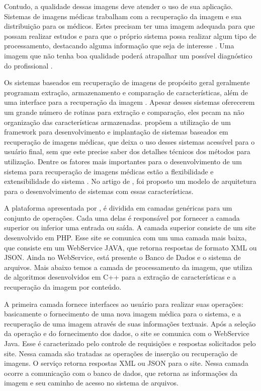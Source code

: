 Contudo, a qualidade dessas imagens deve atender o uso de sua aplicação.
Sistemas de imagens médicas trabalham com a recuperação da imagem e sua distribuição para os médicos.
Estes precisam ter uma imagem adequada para que possam realizar estudos e para que o próprio sistema possa realizar algum tipo de processamento, destacando alguma informação que seja de interesse \cite{REF12}.
Uma imagem que não tenha boa qualidade poderá atrapalhar um possível diagnóstico do profissional \cite{REF07} \cite{REF15}.

Os sistemas baseados em recuperação de imagens de propósito geral geralmente programam extração, armazenamento e comparação de características, além de uma interface para a recuperação da imagem \cite{REF18}.
Apesar desses sistemas oferecerem um grande número de rotinas para extração e comparação, eles pecam na não organização das características armazenadas.
\cite{REF10} propõem a utilização de um framework para desenvolvimento e implantação de sistemas baseados em recuperação de imagens médicas, que deixa o uso desses sistemas acessível para o usuário final, sem que este precise saber dos detalhes técnicos dos métodos para utilização.
Dentre os fatores mais importantes para o desenvolvimento de um sistema para recuperação de imagens médicas estão a flexibilidade e extensibilidade do sistema \cite{REF18}.
No artigo de \cite{REF10}, foi proposto um modelo de arquitetura para o desenvolvimento de sistemas com essas características.

A plataforma apresentada por \cite{REF18}, é dividida em camadas genéricas para um conjunto de operações.
Cada uma delas é responsável por fornecer a camada superior ou inferior uma entrada ou saída.
A camada superior consiste de um site desenvolvido em PHP.
Esse site se comunica com um uma camada mais baixa, que consiste em um WebService JAVA, que retorna respostas de formato XML ou JSON.
Ainda no WebService, está presente o Banco de Dados e o sistema de arquivos.
Mais abaixo temos a camada de processamento da imagem, que utiliza de algoritmos desenvolvidos em C++ para a extração de características e a recuperação da imagem por conteúdo.

A primeira camada fornece interfaces ao usuário para realizar suas operações: basicamente o fornecimento de uma nova imagem médica para o sistema, e a recuperação de uma imagem através de suas informações textuais.
Após a seleção da operação e do fornecimento dos dados, o site se comunica com o WebService Java. Esse é caracterizado pelo controle de requisições e respostas solicitados pelo site.
Nessa camada são tratadas as operações de inserção ou recuperação de imagens.
O serviço retorna respostas XML ou JSON para o site.
Nessa camada ocorre a comunicação com o banco de dados, que retorna as informações da imagem e seu caminho de acesso no sistema de arquivos.

